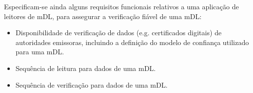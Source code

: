 Especificam-se ainda alguns requisitos funcionais relativos a uma aplicação de leitores de mDL, para assegurar a verificação fiável de uma mDL:

\begin{itemize}
	\item Disponibilidade de verificação de dados (e.g. certificados digitais) de autoridades emissoras, incluindo a definição do modelo de confiança utilizado para uma mDL.
	\item Sequência de leitura para dados de uma mDL.
	\item Sequência de verificação para dados de uma mDL.
\end{itemize}

